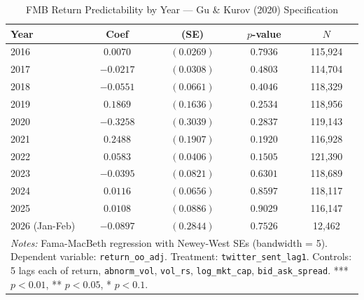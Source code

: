 \begin{table}[htbp]
\centering
\caption{FMB Return Predictability by Year --- Gu \& Kurov (2020) Specification}
\label{tab:gk_fmb_annual}
\begin{tabular}{lcccc}
\hline\hline
Year & Coef & (SE) & $p$-value & $N$ \\
\hline
  2016 & $0.0070$ & $(0.0269)$ & $0.7936$ & 115,924 \\
  2017 & $-0.0217$ & $(0.0308)$ & $0.4803$ & 114,704 \\
  2018 & $-0.0551$ & $(0.0661)$ & $0.4046$ & 118,329 \\
  2019 & $0.1869$ & $(0.1636)$ & $0.2534$ & 118,956 \\
  2020 & $-0.3258$ & $(0.3039)$ & $0.2837$ & 119,143 \\
  2021 & $0.2488$ & $(0.1907)$ & $0.1920$ & 116,928 \\
  2022 & $0.0583$ & $(0.0406)$ & $0.1505$ & 121,390 \\
  2023 & $-0.0395$ & $(0.0821)$ & $0.6301$ & 118,689 \\
  2024 & $0.0116$ & $(0.0656)$ & $0.8597$ & 118,117 \\
  2025 & $0.0108$ & $(0.0886)$ & $0.9029$ & 116,147 \\
  2026 (Jan-Feb) & $-0.0897$ & $(0.2844)$ & $0.7526$ & 12,462 \\
\hline\hline
\multicolumn{5}{p{0.9\linewidth}}{\footnotesize \textit{Notes:} Fama-MacBeth regression with Newey-West SEs (bandwidth = 5). Dependent variable: \texttt{return\_oo\_adj}. Treatment: \texttt{twitter\_sent\_lag1}. Controls: 5 lags each of return, \texttt{abnorm\_vol}, \texttt{vol\_rs}, \texttt{log\_mkt\_cap}, \texttt{bid\_ask\_spread}. *** $p<0.01$, ** $p<0.05$, * $p<0.1$.} \\
\end{tabular}
\end{table}